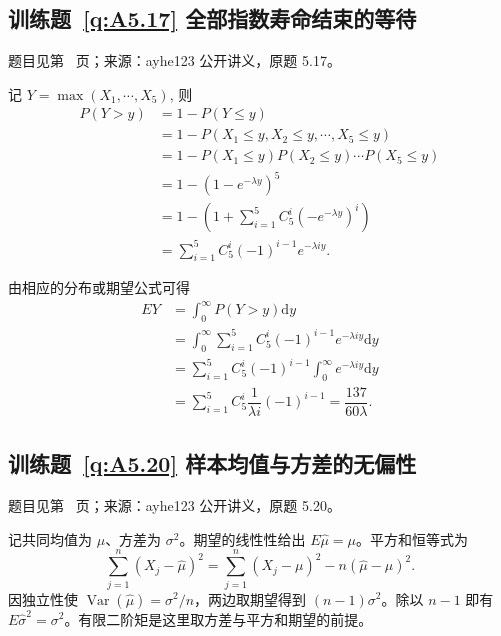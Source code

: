\documentclass[UTF8,12pt,a4paper,fontset=fandol]{ctexbook}
\begin{document}
\subsection*{训练题~\ref{q:A5.17} 全部指数寿命结束的等待}\label{a:A5.17}{\small 题目见第~\pageref{q:A5.17} 页；来源：ayhe123 公开讲义，原题 5.17。}
\begin{solve}
    记 $Y=\max(X_1,\cdots,X_5)$, 则
    \begin{align*}
        P(Y>y) & =1-P(Y\leq y) \\
        & =1-P(X_1\leq y,X_2\leq y,\cdots,X_5\leq y) \\
        & =1-P(X_1\leq y)P(X_2\leq y)\cdots P(X_5\leq y) \\
        & =1-(1-e^{-\lambda y})^5 \\
        & =1-\left(1+\sum\limits_{i=1}^5C_5^i(-e^{-\lambda y})^i\right) \\
        & =\sum\limits_{i=1}^5C_5^i(-1)^{i-1}e^{-\lambda iy}.
    \end{align*}

    由相应的分布或期望公式可得
    \begin{align*}
        EY & =\int_0^\infty P(Y>y)\mathrm{d}y \\
        & =\int_0^\infty\sum\limits_{i=1}^5C_5^i(-1)^{i-1}e^{-\lambda iy}\mathrm{d}y \\
        & =\sum\limits_{i=1}^5C_5^i(-1)^{i-1}\int_0^\infty e^{-\lambda iy}\mathrm{d}y \\
        & =\sum\limits_{i=1}^5C_5^i\dfrac{1}{\lambda i}(-1)^{i-1}=\dfrac{137}{60\lambda}.
    \end{align*}
\end{solve}

\subsection*{训练题~\ref{q:A5.20} 样本均值与方差的无偏性}\label{a:A5.20}{\small 题目见第~\pageref{q:A5.20} 页；来源：ayhe123 公开讲义，原题 5.20。}
\begin{solve}记共同均值为 $\mu$、方差为 $\sigma^2$。期望的线性性给出 $E\widehat\mu=\mu$。平方和恒等式为\[\sum_{j=1}^n(X_j-\widehat\mu)^2=\sum_{j=1}^n(X_j-\mu)^2-n(\widehat\mu-\mu)^2.\]因独立性使 $\operatorname{Var}(\widehat\mu)=\sigma^2/n$，两边取期望得到 $(n-1)\sigma^2$。除以 $n-1$ 即有 $E\widehat\sigma^2=\sigma^2$。有限二阶矩是这里取方差与平方和期望的前提。\end{solve}
\end{document}
